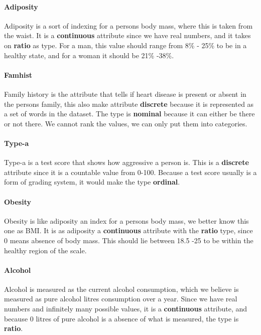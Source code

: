 \paragraph{Adiposity} Adiposity is a sort of indexing for a persons body mass, where this is taken from the waist. It is a \textbf{continuous} attribute since we have real numbers, and it takes on \textbf{ratio} as type. For a man, this value should range from 8\% - 25\% to be in a healthy state, and for a woman it should be 21\% -38\%.

\paragraph{Famhist} Family history is the attribute that tells if heart disease is present or absent in the persons family, this also make attribute \textbf{discrete} because it is represented as a set of words in the dataset. The type is \textbf{nominal} because it can either be there or not there. We cannot rank the values, we can only put them into categories.

\paragraph{Type-a} Type-a is a test score that shows how aggressive a person is. This is a \textbf{discrete} attribute since it is a countable value from 0-100. Because a test score usually is a form of grading system, it would make the type \textbf{ordinal}.

\paragraph{Obesity} Obesity is like adiposity an index for a persons body mass, we better know this one as BMI. It is as adiposity a \textbf{continuous} attribute with the \textbf{ratio} type, since 0 means absence of body mass. This should lie between 18.5 -25 to be within the healthy region of the scale.

\paragraph{Alcohol} Alcohol is measured as the current alcohol consumption, which we believe is measured as pure alcohol litres consumption over a year. Since we have real numbers and infinitely many possible values, it is a \textbf{continuous} attribute, and because 0 litres of pure alcohol is a absence of what is measured, the type is \textbf{ratio}.


